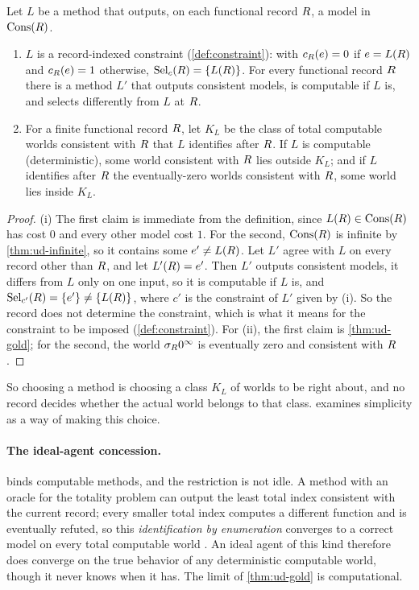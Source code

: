 \begin{lemma}\label{lem:bias}
Let $L$ be a method that outputs, on each functional record $R$, a model in
$\operatorname{Cons}(R)$.
\begin{enumerate}[label=(\roman*)]
  \item $L$ is a record-indexed constraint (\cref{def:constraint}): with
        $c_R(e)=0$ if $e=L(R)$ and $c_R(e)=1$ otherwise,
        $\operatorname{Sel}_c(R)=\{L(R)\}$. For every functional record $R$ there is a
        method $L'$ that outputs consistent models, is computable if $L$ is, and
        selects differently from $L$ at $R$.
  \item For a finite functional record $R$, let $K_L$ be the class of total
        computable worlds consistent with $R$ that $L$ identifies after $R$. If
        $L$ is computable (deterministic), some world consistent with $R$ lies
        outside $K_L$; and if $L$ identifies after $R$ the eventually-zero worlds
        consistent with $R$, some world lies inside $K_L$.
\end{enumerate}
\end{lemma}

\begin{proof}
(i) The first claim is immediate from the definition, since $L(R)\in\operatorname{Cons}(R)$ has
cost $0$ and every other model cost $1$. For the second, $\operatorname{Cons}(R)$ is infinite by
\cref{thm:ud-infinite}, so it contains some $e'\ne L(R)$. Let $L'$ agree with $L$ on
every record other than $R$, and let $L'(R)=e'$. Then $L'$ outputs consistent
models, it differs from $L$ only on one input, so it is computable if $L$ is, and
$\operatorname{Sel}_{c'}(R)=\{e'\}\neq\{L(R)\}$, where $c'$ is the constraint of $L'$ given by
(i). So the record does not determine the
constraint, which is what it means for the constraint to be imposed
(\cref{def:constraint}). For (ii), the first claim is \cref{thm:ud-gold}; for the
second, the world $\sigma_R0^\infty$ is eventually zero and consistent with $R$.
\end{proof}

So choosing a method is choosing a class $K_L$ of worlds to be right about, and no
record decides whether the actual world belongs to that class. 
examines simplicity as a way of making this choice.

\paragraph{The ideal-agent concession.}
 binds computable methods, and the restriction is not idle. A
method with an oracle for the totality problem can output the least total index
consistent with the current record; every smaller total index computes a different
function and is eventually refuted, so this \emph{identification by enumeration}
converges to a correct model on every total computable world
\citep{putnam1963,gold1967}. An ideal agent of this
kind therefore does converge on the true behavior of any deterministic computable
world, though it never knows when it has. The limit of \cref{thm:ud-gold} is
computational.
